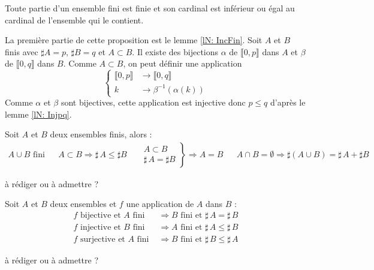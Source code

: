 \begin{prop}[\ref{pN: InCard}]
Toute partie d'un ensemble fini est finie et son cardinal est inférieur ou égal au cardinal de l'ensemble qui le contient. 
\end{prop}
\begin{demo}
 La première partie de cette proposition est le lemme \ref{lN: IncFin}. Soit $A$ et $B$ finis avec $\sharp A =p$, $\sharp B =q$ et $A\subset B$. Il existe des bijections $\alpha$ de $\llbracket 0,p\rrbracket$ dans $A$ et $\beta$ de $\llbracket 0,q\rrbracket$ dans $B$. Comme $A\subset B$, on peut définir une application
\begin{displaymath}
 \left\lbrace 
\begin{aligned}
 \llbracket 0,p\rrbracket &\rightarrow \llbracket 0,q\rrbracket \\
 k &\rightarrow \beta^{-1}(\alpha(k))
\end{aligned}
\right. 
\end{displaymath}
 Comme $\alpha$ et $\beta$ sont bijectives, cette application est injective donc $p\leq q$ d'après le lemme \ref{lN: Injpq}.
\end{demo}


\begin{prop}[\ref{pN: PropParFin}]
Soit $A$ et $B$ deux ensembles finis, alors :
\begin{align*}
A\cup B \text{ fini} & & A\subset B \Rightarrow  \sharp\, A \leq \sharp B  & & 
\left. 
\begin{aligned}
 A\subset B \\
 \sharp\, A = \sharp B
\end{aligned}
\right\rbrace \Rightarrow A = B
& &
A\cap B = \emptyset \Rightarrow
\sharp (A\cup B ) = \sharp\,A + \sharp B
\end{align*}
\end{prop}
\begin{demo}
 à rédiger ou à admettre ?
\end{demo}

\begin{prop}[\ref{pN: PropAppFin}]
 Soit $A$ et $B$ deux ensembles et $f$ une application de $A$ dans $B$ :
\begin{align*}
 f \text{ bijective et } A \text{ fini }   &\Rightarrow B \text{ fini et } \sharp\, A = \sharp\, B \\
 f \text{ injective et } B \text{ fini }  &\Rightarrow A \text{ fini et } \sharp\, A \leq \sharp\, B \\
 f \text{ surjective et } A \text{ fini } &\Rightarrow B \text{ fini et } \sharp\, B \leq \sharp\, A 
\end{align*}
\end{prop}
\begin{demo}
 à rédiger  ou à admettre ?
\end{demo}

